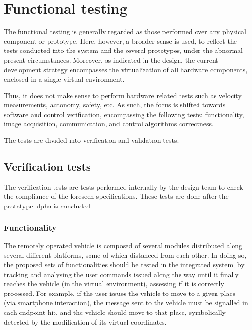 \section{Functional testing}%
\label{sec:org3e2776f}
The functional testing is generally regarded as those performed over any physical
component or prototype. Here, however, a broader sense is used, to reflect the
tests conducted into the system and the several prototypes, under the abnormal
present circumstances.
Moreover, as indicated in the design, the current development
strategy encompasses the virtualization of all hardware components, enclosed
in a single virtual environment.

Thus, it does not make sense to perform
hardware related tests such as velocity measurements, autonomy, safety, etc. As
such, the focus is shifted towards software and control verification,
encompassing the following tests: functionality, image acquisition,
communication, and control algorithms correctness.

The tests are divided into verification and validation tests.
\subsection{Verification tests}%
\label{sec:orge9c79e2}
The verification tests are tests performed internally by the design team to
check the compliance of the foreseen specifications. These tests are done after
the prototype alpha is concluded.

\subsubsection{Functionality}%
\label{sec:functionality}
The remotely operated vehicle is composed of several modules distributed along
several different platforms, some of which distanced from each other.
In doing so, the
proposed sets of functionalities should be tested in the integrated system, by
tracking and analysing the user commands issued along the way until it finally
reaches the vehicle (in the virtual environment), assessing if it is correctly
processed. For example, if the user issues the vehicle to move to a given place
(via smartphone interaction), the message sent to the vehicle must be signalled
in each endpoint hit, and the vehicle should move to that place, symbolically
detected by the modification of its virtual coordinates.

